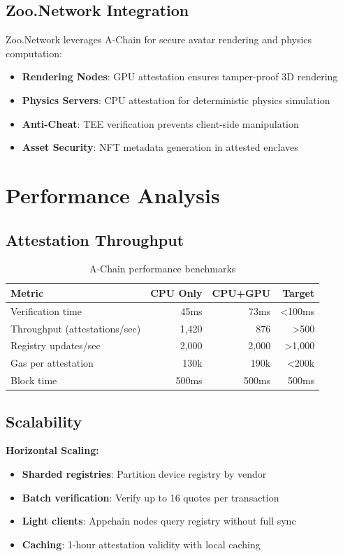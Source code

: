 \documentclass[11pt,a4paper]{article}
\begin{document}
\subsection{Zoo.Network Integration}

Zoo.Network leverages A-Chain for secure avatar rendering and physics computation:

\begin{itemize}
\item \textbf{Rendering Nodes}: GPU attestation ensures tamper-proof 3D rendering
\item \textbf{Physics Servers}: CPU attestation for deterministic physics simulation
\item \textbf{Anti-Cheat}: TEE verification prevents client-side manipulation
\item \textbf{Asset Security}: NFT metadata generation in attested enclaves
\end{itemize}

\section{Performance Analysis}

\subsection{Attestation Throughput}

\begin{table}[h]
\centering
\begin{tabular}{@{}lrrr@{}}
\toprule
\textbf{Metric} & \textbf{CPU Only} & \textbf{CPU+GPU} & \textbf{Target} \\ \midrule
Verification time & 45ms & 73ms & <100ms \\
Throughput (attestations/sec) & 1,420 & 876 & >500 \\
Registry updates/sec & 2,000 & 2,000 & >1,000 \\
Gas per attestation & 130k & 190k & <200k \\
Block time & 500ms & 500ms & 500ms \\ \bottomrule
\end{tabular}
\caption{A-Chain performance benchmarks}
\end{table}

\subsection{Scalability}

\textbf{Horizontal Scaling:}
\begin{itemize}
\item \textbf{Sharded registries}: Partition device registry by vendor
\item \textbf{Batch verification}: Verify up to 16 quotes per transaction
\item \textbf{Light clients}: Appchain nodes query registry without full sync
\item \textbf{Caching}: 1-hour attestation validity with local caching
\end{itemize}
\end{document}
